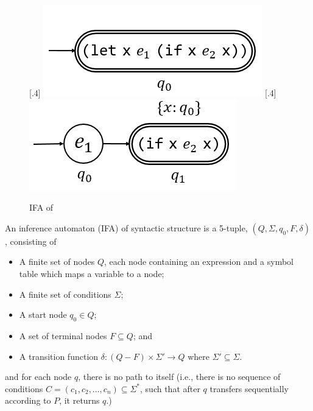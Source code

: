\begin{figure}[t]
    \centering
    [.4\linewidth]{
        \includegraphics[scale=0.25]{images/ifa/ifa-and-1.png}
    }
    [.4\linewidth]{
        \includegraphics[scale=0.25]{images/ifa/ifa-and-2.png}
    }
    \caption{IFA of }
    \label{fig:ifa-and}
\end{figure}


\begin{Def}

    An inference automaton (IFA) of syntactic structure  is a 5-tuple, $(Q, \Sigma, q_0, F, \delta)$, consisting of

    \begin{itemize}
        \item A finite set of nodes $Q$, each node containing an expression and a symbol table which maps a variable to a node;
        \item A finite set of conditions $\Sigma$;
        \item A start node $q_0 \in Q$;
        \item A set of terminal nodes $F \subseteq Q$; and
        \item A transition function $\delta: (Q-F) \times \Sigma' \to Q$ where $\Sigma' \subseteq \Sigma$.
    \end{itemize}
    and for each node $q$, there is no path to itself (i.e., there is no sequence of conditions $C = (c_1,c_2,\ldots,c_n)\subseteq \Sigma^*$, such that after $q$ transfers sequentially according to $P$, it returns $q$.)

\end{Def}

